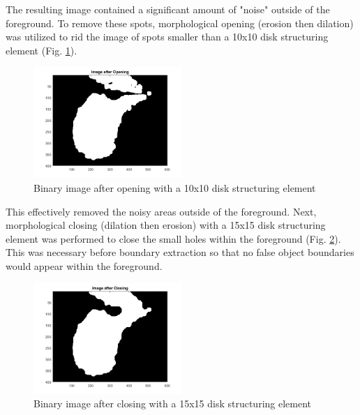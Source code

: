 \documentclass{article}[12 pt]
\begin{document}
\noindent 
The resulting image contained a significant amount of "noise" outside of the foreground.  To remove these spots, morphological opening (erosion then dilation) was utilized to rid the image of spots smaller than a 10x10 disk structuring element (Fig. \ref{openedImage}).

\begin{center}
	\begin{figure}[H]
		\centering
		\includegraphics[width = 0.5\textwidth]{Images/openedImage.png}
		\caption{Binary image after opening with a 10x10 disk structuring element}
		\label{openedImage}
	\end{figure}
\end{center}

\noindent
This effectively removed the noisy areas outside of the foreground.  Next, morphological closing (dilation then erosion) with a 15x15 disk structuring element was performed to close the small holes within the foreground (Fig. \ref{closedImage}).  This was necessary before boundary extraction so that no false object boundaries would appear within the foreground.

\begin{center}
	\begin{figure}[H]
		\centering
		\includegraphics[width = 0.5\textwidth]{Images/closedImage.png}
		\caption{Binary image after closing with a 15x15 disk structuring element}
		\label{closedImage}
	\end{figure}
\end{center}
\end{document}
